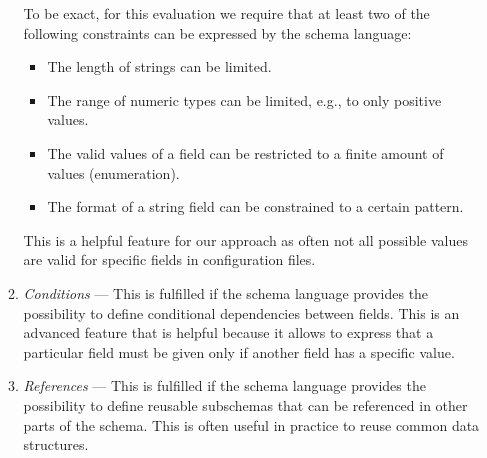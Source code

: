 \begin{enumerate}
\begin{enumerate}
        To be exact, for this evaluation we require that at least two of the following constraints can be expressed by the schema language:
        \begin{itemize}
            \item The length of strings can be limited.
            \item The range of numeric types can be limited, e.g., to only positive values.
            \item The valid values of a field can be restricted to a finite amount of values (enumeration).
            \item The format of a string field can be constrained to a certain pattern.
        \end{itemize}
        This is a helpful feature for our approach as often not all possible values are valid for specific fields in configuration files.
        \item \textit{Conditions} --- This is fulfilled if the schema language provides the possibility to define conditional dependencies between fields.
        This is an advanced feature that is helpful because it allows to express that a particular field must be given only if another field has a specific value.
        \item \textit{References} --- This is fulfilled if the schema language provides the possibility to define reusable subschemas that can be referenced in other parts of the schema.
        This is often useful in practice to reuse common data structures.

    \end{enumerate}



\end{enumerate}


